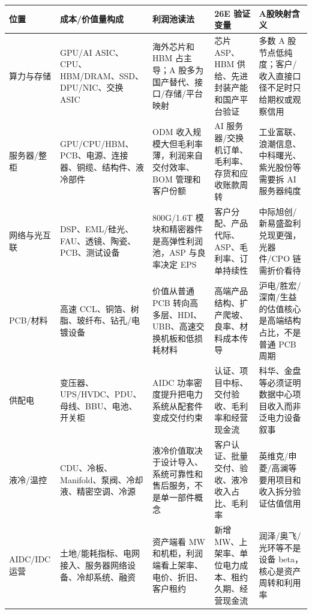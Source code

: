 \begin{exhibitbox}
\scriptsize
\begin{longtable}{L{1.8cm}L{3.2cm}L{3.7cm}L{3.2cm}L{3.6cm}}
\toprule
\textbf{位置} & \textbf{成本/价值量构成} & \textbf{利润池读法} & \textbf{26E 验证变量} & \textbf{A股映射含义}\\
\midrule
\endhead
算力与存储 & GPU/AI ASIC、CPU、HBM/DRAM、SSD、DPU/NIC、交换 ASIC & 海外芯片和 HBM 占主导；A 股多为国产替代、接口/存储/平台映射 & 芯片 ASP、HBM 供给、先进封装产能和国产平台验证 & 多数 A 股节点低纯度；客户/收入直接口径不足时只给期权或观察信用\\
服务器/整柜 & GPU/CPU/HBM、PCB、电源、连接器、铜缆、结构件、液冷部件 & ODM 收入规模大但毛利率薄，利润来自交付效率、BOM 管理和客户份额 & AI 服务器/交换机订单、毛利率、存货和应收账款周转 & 工业富联、浪潮信息、中科曙光、紫光股份等需要拆 AI 服务器纯度\\
网络与光互联 & DSP、EML/硅光、FAU、透镜、陶瓷、PCB、测试设备 & 800G/1.6T 模块和精密器件是高弹性利润池，ASP 与良率决定 EPS & 客户分配、产品代际、ASP、毛利率、订单持续性 & 中际旭创/新易盛盈利兑现更强，光器件/CPO 链需折价看待\\
PCB/材料 & 高速 CCL、铜箔、树脂、玻纤布、钻孔/电镀设备 & 价值从普通 PCB 转向高多层、HDI、UBB、高速交换机板和低损耗材料 & 高端产品结构、扩产爬坡、良率、材料成本传导 & 沪电/胜宏/深南/生益的估值核心是高端结构占比，不是普通 PCB 周期\\
供配电 & 变压器、UPS/HVDC、PDU、母线、BBU、电池、开关柜 & AIDC 功率密度提升把电力系统从配套件变成交付约束 & 认证、项目中标、交付验收、毛利率和经营现金流 & 科华、金盘等必须证明数据中心项目收入而非泛电力设备叙事\\
液冷/温控 & CDU、冷板、Manifold、泵阀、冷却液、精密空调、冷源 & 液冷价值取决于设计导入、系统可靠性和售后服务，不是单一部件概念 & 客户认证、批量交付、验收、液冷收入占比、毛利率 & 英维克/申菱/高澜等要用项目和收入拆分验证估值信用\\
AIDC/IDC 运营 & 土地/能耗指标、电网接入、服务器网络设备、冷却系统、融资 & 资产端看 MW 和机柜，利润端看上架率、电价、折旧、客户租约 & 新增 MW、上架率、单位电力成本、租约久期、经营现金流 & 润泽/奥飞/光环等不是设备 beta，核心是资产周转和利用率\\
\bottomrule
\end{longtable}
\end{exhibitbox}

